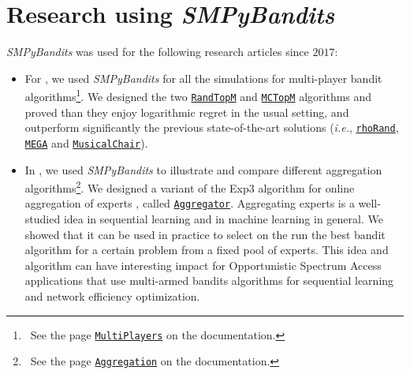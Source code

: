 \documentclass[a4paper,10pt,]{article}
\providecommand{\tightlist}{%
  \setlength{\itemsep}{0pt}\setlength{\parskip}{0pt}}
\begin{document}
\section{\texorpdfstring{Research using \emph{SMPyBandits}}{Research using SMPyBandits}}\label{research-using-smpybandits}

\emph{SMPyBandits} was used for the following research articles since
\(2017\):

\begin{itemize}
\tightlist
\item
  For \citet{BessonALT2018}, we used \emph{SMPyBandits} for all the
  simulations for multi-player bandit algorithms\footnote{~See
    the page
    \href{https://smpybandits.github.io/MultiPlayers.html}{\texttt{MultiPlayers}}
    on the documentation.}. We designed the two
  \href{https://smpybandits.github.io/docs/PoliciesMultiPlayers.RandTopM.html}{\texttt{RandTopM}}
  and
  \href{https://smpybandits.github.io/docs/PoliciesMultiPlayers.MCTopM.html}{\texttt{MCTopM}}
  algorithms and proved than they enjoy logarithmic regret in the usual
  setting, and outperform significantly the previous state-of-the-art
  solutions (\emph{i.e.},
  \href{https://smpybandits.github.io/docs/PoliciesMultiPlayers.rhoRand.html}{\texttt{rhoRand}},
  \href{https://smpybandits.github.io/docs/Policies.MEGA.html}{\texttt{MEGA}}
  and
  \href{https://smpybandits.github.io/docs/Policies.MusicalChair.html}{\texttt{MusicalChair}}).
\end{itemize}

\begin{itemize}
\tightlist
\item
  In \citet{BessonWCNC2018}, we used \emph{SMPyBandits} to illustrate and
  compare different aggregation algorithms\footnote{~See the page
    \href{https://smpybandits.github.io/Aggregation.html}{\texttt{Aggregation}}
    on the documentation.}. We designed a variant of the Exp3 algorithm
  for online aggregation of experts \citep{Bubeck12}, called
  \href{https://smpybandits.github.io/docs/Policies.Aggregator.html}{\texttt{Aggregator}}.
  Aggregating experts is a well-studied idea in sequential learning and
  in machine learning in general. We showed that it can be used in
  practice to select on the run the best bandit algorithm for a certain
  problem from a fixed pool of experts. This idea and algorithm can have
  interesting impact for Opportunistic Spectrum Access applications
  \citep{Jouini09} that use multi-armed bandits algorithms for sequential
  learning and network efficiency optimization.
\end{itemize}
\end{document}
